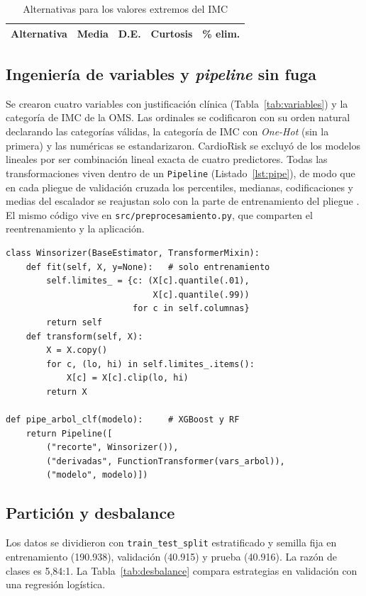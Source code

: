 \documentclass[conference,a4paper]{IEEEtran}
\begin{document}
\begin{table}[!t]
\centering
\caption{Alternativas para los valores extremos del IMC}
\label{tab:atipicos}
\scriptsize
\begin{tabular}{@{}lrrrr@{}}
\toprule
\textbf{Alternativa} & \textbf{Media} & \textbf{D.E.} & \textbf{Curtosis} & \textbf{\% elim.} \\
\midrule

\end{tabular}
\end{table}

\subsection{Ingeniería de variables y \textit{pipeline} sin fuga}
Se crearon cuatro variables con justificación clínica (Tabla~\ref{tab:variables}) y la categoría de IMC de la OMS. Las ordinales se codificaron con su orden natural declarando las categorías válidas, la categoría de IMC con \textit{One-Hot} (sin la primera) y las numéricas se estandarizaron. CardioRisk se excluyó de los modelos lineales por ser combinación lineal exacta de cuatro predictores. Todas las transformaciones viven dentro de un \texttt{Pipeline} (Listado~\ref{lst:pipe}), de modo que en cada pliegue de validación cruzada los percentiles, medianas, codificaciones y medias del escalador se reajustan solo con la parte de entrenamiento del pliegue \citep{kaufman2012}. El mismo código vive en \texttt{src/preprocesamiento.py}, que comparten el reentrenamiento y la aplicación.

\begin{lstlisting}[caption={Extracto de \texttt{src/preprocesamiento.py}}, label={lst:pipe}]
class Winsorizer(BaseEstimator, TransformerMixin):
    def fit(self, X, y=None):   # solo entrenamiento
        self.limites_ = {c: (X[c].quantile(.01),
                             X[c].quantile(.99))
                         for c in self.columnas}
        return self
    def transform(self, X):
        X = X.copy()
        for c, (lo, hi) in self.limites_.items():
            X[c] = X[c].clip(lo, hi)
        return X

def pipe_arbol_clf(modelo):     # XGBoost y RF
    return Pipeline([
        ("recorte", Winsorizer()),
        ("derivadas", FunctionTransformer(vars_arbol)),
        ("modelo", modelo)])
\end{lstlisting}

\subsection{Partición y desbalance}
Los datos se dividieron con \texttt{train\_test\_split} estratificado y semilla fija en entrenamiento (190.938), validación (40.915) y prueba (40.916). La razón de clases es 5,84:1. La Tabla~\ref{tab:desbalance} compara estrategias en validación con una regresión logística.
\end{document}

